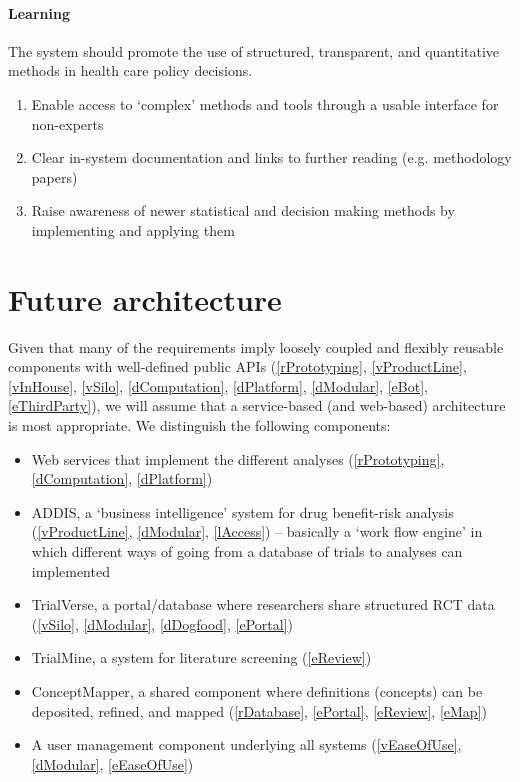 \documentclass[a4paper]{article}
\begin{document}
\paragraph{Learning}
The system should promote the use of structured, transparent, and quantitative methods in health care policy decisions.
\begin{enumerate}[label=L\arabic*]
\item\label{lAccess} Enable access to `complex' methods and tools through a usable interface for non-experts
\item\label{lDocumentation} Clear in-system documentation and links to further reading (e.g. methodology papers)
\item\label{lAwareness} Raise awareness of newer statistical and decision making methods by implementing and applying them
\end{enumerate}

\section{Future architecture}

Given that many of the requirements imply loosely coupled and flexibly reusable components with well-defined public APIs (\ref{rPrototyping}, \ref{vProductLine}, \ref{vInHouse}, \ref{vSilo}, \ref{dComputation}, \ref{dPlatform}, \ref{dModular}, \ref{eBot}, \ref{eThirdParty}), we will assume that a service-based (and web-based) architecture is most appropriate.
We distinguish the following components:
\begin{itemize}
\item Web services that implement the different analyses (\ref{rPrototyping}, \ref{dComputation}, \ref{dPlatform})
\item ADDIS, a `business intelligence' system for drug benefit-risk analysis (\ref{vProductLine}, \ref{dModular}, \ref{lAccess}) -- basically a `work flow engine' in which different ways of going from a database of trials to analyses can implemented
\item TrialVerse, a portal/database where researchers share structured RCT data (\ref{vSilo}, \ref{dModular}, \ref{dDogfood}, \ref{ePortal})
\item TrialMine, a system for literature screening (\ref{eReview})
\item ConceptMapper, a shared component where definitions (concepts) can be deposited, refined, and mapped (\ref{rDatabase}, \ref{ePortal}, \ref{eReview}, \ref{eMap})
\item A user management component underlying all systems (\ref{vEaseOfUse}, \ref{dModular}, \ref{eEaseOfUse})
\end{itemize}
\end{document}
